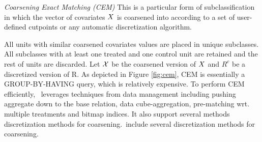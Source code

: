 {\it Coarsening Exact Matching (CEM)} This is a particular form of subclassification in which the vector of covariates ${{X}}$ is
coarsened into according to a set of user-defined cutpoints or any
automatic discretization algorithm.
All units with similar coarsened
covariates values are placed in unique subclasses. All
subclasses with at least one treated and one control unit are retained
and the rest of units are discarded.  Let ${{\mathcal{X}}}$ be the
coarsened version of ${{X}}$ and $R^c$ be a discretized
version of R. As depicted in Figure \ref{fig:cem},
CEM is essentially a GROUP-BY-HAVING query, which is relatively expensive.
To perform CEM efficiently, \GSQL\ leverages techniques from data management
 including pushing aggregate down to the base relation,
  data cube-aggregation, pre-matching wrt. multiple treatments and bitmap indices. It also support several methods discretization methods for coarsening.\GSQL\ include several discretization methods for coarsening.








